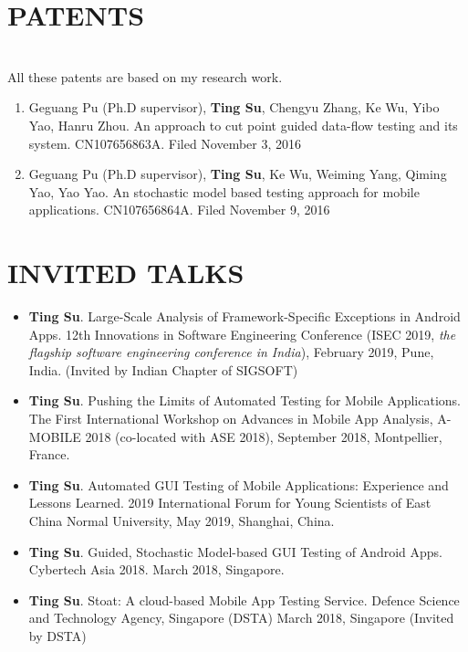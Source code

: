 \documentclass[margin]{res}
\begin{document}
\begin{resume}
\section{PATENTS}
\\
All these patents are based on my research work.
\begin{enumerate}[leftmargin=*]
    \item Geguang Pu (Ph.D supervisor), \textbf{Ting Su}, Chengyu Zhang, Ke Wu, Yibo Yao, Hanru Zhou. An approach to cut point guided data-flow testing and its system. CN107656863A. Filed November 3, 2016
    \item Geguang Pu (Ph.D supervisor), \textbf{Ting Su}, Ke Wu, Weiming Yang, Qiming Yao, Yao Yao. An stochastic model based testing approach for mobile applications. CN107656864A. Filed November 9, 2016
\end{enumerate}

\section{INVITED TALKS}
\begin{itemize}[leftmargin=*]
   
    \item \textbf{Ting Su}. Large-Scale Analysis of Framework-Specific Exceptions in Android Apps. 12th Innovations in Software Engineering Conference (ISEC 2019, \emph{the flagship software engineering conference in India}), February 2019, Pune, India. (Invited by Indian Chapter of SIGSOFT)
    \item \textbf{Ting Su}. Pushing the Limits of Automated Testing for Mobile Applications. The First International Workshop on Advances in Mobile App Analysis, A-MOBILE 2018 (co-located with ASE 2018), September 2018, Montpellier, France.
    \item \textbf{Ting Su}. Automated GUI Testing of Mobile Applications: Experience and Lessons Learned. 2019 International Forum for Young Scientists of East China Normal University, May 2019, Shanghai, China.
    \item \textbf{Ting Su}. Guided, Stochastic Model-based GUI Testing of Android Apps. Cybertech Asia 2018. March 2018, Singapore.
    \item \textbf{Ting Su}. Stoat: A cloud-based Mobile App Testing Service. Defence Science and Technology Agency, Singapore (DSTA) March 2018, Singapore (Invited by DSTA)
\end{itemize}


\end{resume}
\end{document}

